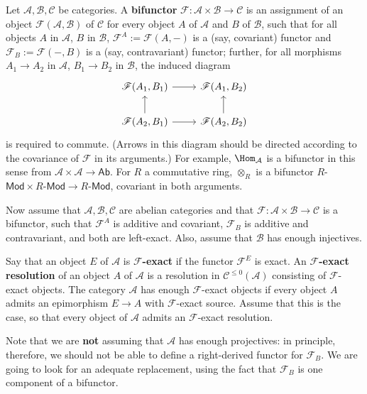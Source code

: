 \begin{exercise}
Let $\mathcal{A},\mathcal{B},\mathcal{C}$ be categories. A \textbf{bifunctor} $\mathscr{F}:\mathcal{A}\times\mathcal{B}\to\mathcal{C}$ is an assignment of an object $\mathscr{F}(\mathcal{A},\mathcal{B})$ of $\mathcal{C}$ for every object $A$ of $\mathcal{A}$ and $B$ of $\mathcal{B}$, such that for all objects $A$ in $\mathcal{A}$, $B$ in $\mathcal{B}$, $\mathscr{F}^{A}:=\mathscr{F}(A,-)$ is a (say, covariant) functor and $\mathscr{F}_{B}:=\mathscr{F}(-,B)$ is a (say, contravariant) functor; further, for all morphisms $A_1\to A_2$ in $\mathcal{A}$, $B_1\to B_2$ in $\mathcal{B}$, the induced diagram
\[\begin{tikzcd}
\mathscr{F}(A_1,B_1)\ar[r]&\mathscr{F}(A_1,B_2)\\
\mathscr{F}(A_2,B_1)\ar[u]\ar[r]&\mathscr{F}(A_2,B_2)\ar[u]
\end{tikzcd}\]
is required to commute. (Arrows in this diagram should be directed according to the covariance of $\mathscr{F}$ in its arguments.) For example, $\Hom_{\mathcal{A}}$ is a bifunctor in this sense from $\mathcal{A}\times\mathcal{A}\to\mathsf{Ab}$. For $R$ a commutative ring, $\otimes_{R}$ is a bifunctor $R$-$\mathsf{Mod}\times R$-$\mathsf{Mod}\to R$-$\mathsf{Mod}$, covariant in both arguments.\par
Now assume that $\mathcal{A},\mathcal{B},\mathcal{C}$ are abelian categories and that $\mathscr{F}:\mathcal{A}\times\mathcal{B}\to\mathcal{C}$ is a bifunctor, such that $\mathscr{F}^A$ is additive and covariant, $\mathscr{F}_B$ is additive and contravariant, and both are left-exact. Also, assume that $\mathcal{B}$ has enough injectives.\par
Say that an object $E$ of $\mathcal{A}$ is \textbf{$\mathscr{F}$-exact} if the functor $\mathscr{F}^E$ is exact. An \textbf{$\mathscr{F}$-exact resolution} of an object $A$ of $\mathcal{A}$ is a resolution in $\mathcal{C}^{\leq0}(\mathcal{A})$ consisting of $\mathscr{F}$-exact objects. The category $\mathcal{A}$ has enough $\mathscr{F}$-exact objects if every object $A$ admits an epimorphism $E\to A$ with $\mathscr{F}$-exact source. Assume that this is the case, so that every object of $\mathcal{A}$ admits an $\mathscr{F}$-exact resolution.\par
Note that we are \textbf{not} assuming that $\mathcal{A}$ has enough projectives: in principle, therefore, we should not be able to define a right-derived functor for $\mathscr{F}_B$. We are going to look for an adequate replacement, using the fact that $\mathscr{F}_B$ is one component of a bifunctor.\par

\end{exercise}
